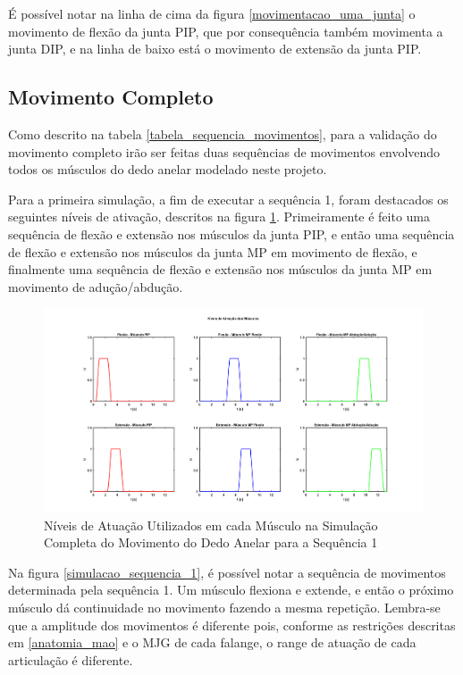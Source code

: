 É possível notar na linha de cima da figura \ref{movimentacao_uma_junta} o movimento de flexão da junta PIP, que por consequência também movimenta a junta DIP, e na linha de baixo está o movimento de extensão da junta PIP.

\subsection{Movimento Completo}
Como descrito na tabela \ref{tabela_sequencia_movimentos}, para a validação do movimento completo irão ser feitas duas sequências de movimentos envolvendo todos os músculos do dedo anelar modelado neste projeto.

Para a primeira simulação, a fim de executar a sequência 1, foram destacados os seguintes níveis de ativação, descritos na figura \ref{niveis_atuacao_simulacao}. Primeiramente é feito uma sequência de flexão e extensão nos músculos da junta PIP, e então uma sequência de flexão e extensão nos músculos da junta MP em movimento de flexão, e finalmente uma sequência de flexão e extensão nos músculos da junta MP em movimento de adução/abdução.

\begin{figure}[H]
\centering
\includegraphics[width = 1\textwidth]{img/niveis_simulacao.png}
\caption[Níveis de Atuação Utilizados em cada Músculo na Simulação Completa do Movimento do Dedo Anelar para a Sequência 1]{Níveis de Atuação Utilizados em cada Músculo na Simulação Completa do Movimento do Dedo Anelar para a Sequência 1}
\label{niveis_atuacao_simulacao}
\end{figure}

Na figura \ref{simulacao_sequencia_1}, é possível notar a sequência de movimentos determinada pela sequência 1. Um músculo flexiona e extende, e então o próximo músculo dá continuidade no movimento fazendo a mesma repetição. Lembra-se que a amplitude dos movimentos é diferente pois, conforme as restrições descritas em \ref{anatomia_mao} e o MJG de cada falange, o range de atuação de cada articulação é diferente.

